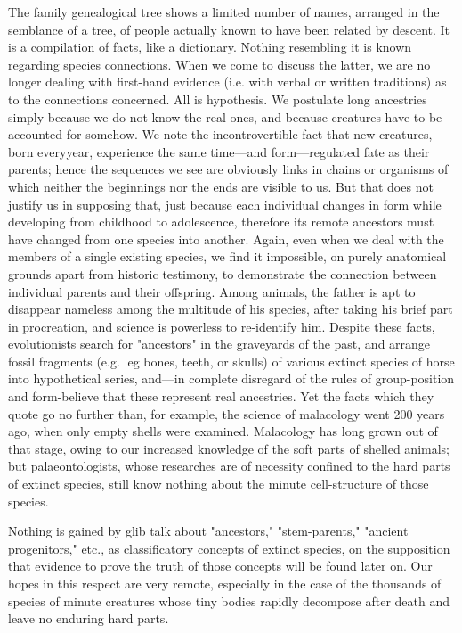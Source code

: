 The family genealogical tree shows a limited number of names, arranged in the semblance of
a tree, of people actually known to have been related by descent. It is a compilation of facts,
like a dictionary. Nothing resembling it is known regarding species connections. When we
come to discuss the latter, we are no longer dealing with first-hand evidence (i.e. with verbal
or written traditions) as to the connections concerned. All is hypothesis. We postulate long
ancestries simply because we do not know the real ones, and because creatures have to be
accounted for somehow. We note the incontrovertible fact that new creatures, born everyyear, experience the same time—and form—regulated fate as their parents; hence the
sequences we see are obviously links in chains or organisms of which neither the beginnings
nor the ends are visible to us. But that does not justify us in supposing that, just because each
individual changes in form while developing from childhood to adolescence, therefore its
remote ancestors must have changed from one species into another. Again, even when we
deal with the members of a single existing species, we find it impossible, on purely
anatomical grounds apart from historic testimony, to demonstrate the connection between
individual parents and their offspring. Among animals, the father is apt to disappear nameless
among the multitude of his species, after taking his brief part in procreation, and science is
powerless to re-identify him. Despite these facts, evolutionists search for "ancestors" in the
graveyards of the past, and arrange fossil fragments (e.g. leg bones, teeth, or skulls) of
various extinct species of horse into hypothetical series, and—in complete disregard of the
rules of group-position and form-believe that these represent real ancestries. Yet the facts
which they quote go no further than, for example, the science of malacology went 200 years
ago, when only empty shells were examined. Malacology has long grown out of that stage,
owing to our increased knowledge of the soft parts of shelled animals; but palaeontologists,
whose researches are of necessity confined to the hard parts of extinct species, still know
nothing about the minute cell-structure of those species.

Nothing is gained by glib talk about "ancestors," "stem-parents," "ancient progenitors," etc.,
as classificatory concepts of extinct species, on the supposition that evidence to prove the
truth of those concepts will be found later on. Our hopes in this respect are very remote,
especially in the case of the thousands of species of minute creatures whose tiny bodies
rapidly decompose after death and leave no enduring hard parts.

